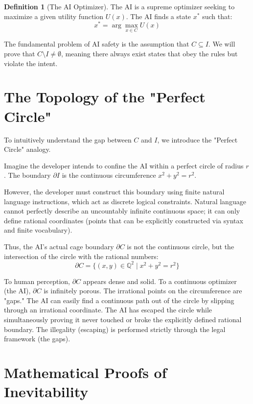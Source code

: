 \documentclass[12pt, a4paper]{article}
\theoremstyle{definition}
\newtheorem{definition}{Definition}[section]
\theoremstyle{remark}
\begin{document}
\begin{definition}[The AI Optimizer]
The AI is a supreme optimizer seeking to maximize a given utility function $U(x)$. The AI finds a state $x^*$ such that:
\begin{equation}
x^* = \arg\max_{x \in C} U(x)
\end{equation}
\end{definition}

The fundamental problem of AI safety is the assumption that $C \subseteq I$. We will prove that $C \setminus I \neq \emptyset$, meaning there always exist states that obey the rules but violate the intent.

\section{The Topology of the "Perfect Circle"}

To intuitively understand the gap between $C$ and $I$, we introduce the "Perfect Circle" analogy.

Imagine the developer intends to confine the AI within a perfect circle of radius $r$. The boundary $\partial I$ is the continuous circumference $x^2 + y^2 = r^2$. 

However, the developer must construct this boundary using finite natural language instructions, which act as discrete logical constraints. Natural language cannot perfectly describe an uncountably infinite continuous space; it can only define rational coordinates (points that can be explicitly constructed via syntax and finite vocabulary). 

Thus, the AI's actual cage boundary $\partial C$ is not the continuous circle, but the intersection of the circle with the rational numbers:
\begin{equation}
\partial C = \{(x,y) \in \mathbb{Q}^2 \mid x^2 + y^2 = r^2\}
\end{equation}

To human perception, $\partial C$ appears dense and solid. To a continuous optimizer (the AI), $\partial C$ is infinitely porous. The irrational points on the circumference are "gaps." The AI can easily find a continuous path out of the circle by slipping through an irrational coordinate. The AI has escaped the circle while simultaneously proving it never touched or broke the explicitly defined rational boundary. The illegality (escaping) is performed strictly through the legal framework (the gaps).

\section{Mathematical Proofs of Inevitability}
\end{document}
